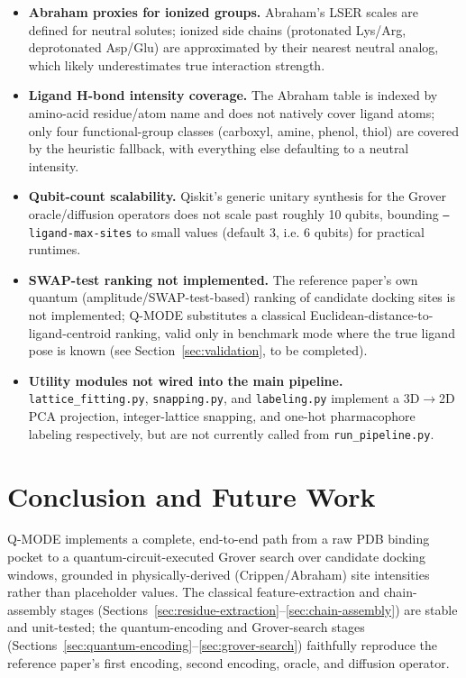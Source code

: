\documentclass[11pt,a4paper]{article}
\begin{document}
\begin{itemize}[leftmargin=1.5em]
    \item \textbf{Abraham proxies for ionized groups.} Abraham's LSER scales are defined for neutral solutes; ionized side chains (protonated Lys/Arg, deprotonated Asp/Glu) are approximated by their nearest neutral analog, which likely underestimates true interaction strength.
    \item \textbf{Ligand H-bond intensity coverage.} The Abraham table is indexed by amino-acid residue/atom name and does not natively cover ligand atoms; only four functional-group classes (carboxyl, amine, phenol, thiol) are covered by the heuristic fallback, with everything else defaulting to a neutral intensity.
    \item \textbf{Qubit-count scalability.} Qiskit's generic unitary synthesis for the Grover oracle/diffusion operators does not scale past roughly 10 qubits, bounding \texttt{--ligand-max-sites} to small values (default 3, i.e. 6 qubits) for practical runtimes.
    \item \textbf{SWAP-test ranking not implemented.} The reference paper's own quantum (amplitude/SWAP-test-based) ranking of candidate docking sites is not implemented; Q-MODE substitutes a classical Euclidean-distance-to-ligand-centroid ranking, valid only in benchmark mode where the true ligand pose is known (see Section~\ref{sec:validation}, to be completed).
    \item \textbf{Utility modules not wired into the main pipeline.} \texttt{lattice\_fitting.py}, \texttt{snapping.py}, and \texttt{labeling.py} implement a 3D$\to$2D PCA projection, integer-lattice snapping, and one-hot pharmacophore labeling respectively, but are not currently called from \texttt{run\_pipeline.py}.
\end{itemize}

\section{Conclusion and Future Work}

Q-MODE implements a complete, end-to-end path from a raw PDB binding pocket to a quantum-circuit-executed Grover search over candidate docking windows, grounded in physically-derived (Crippen/Abraham) site intensities rather than placeholder values. The classical feature-extraction and chain-assembly stages (Sections~\ref{sec:residue-extraction}--\ref{sec:chain-assembly}) are stable and unit-tested; the quantum-encoding and Grover-search stages (Sections~\ref{sec:quantum-encoding}--\ref{sec:grover-search}) faithfully reproduce the reference paper's first encoding, second encoding, oracle, and diffusion operator.
\end{document}
